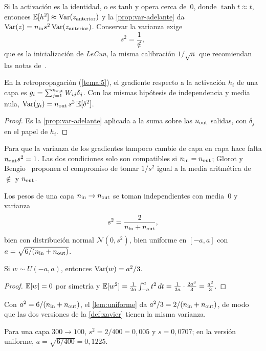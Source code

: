 Si la activación es la identidad, o es tanh y opera cerca de~0, donde $\tanh t\approx t$, entonces $\mathbb{E}[h^{2}]\approx\operatorname{Var}(z_{\text{anterior}})$ y la \cref{prop:var-adelante} da $\operatorname{Var}(z)=n_{\mathrm{in}} s^{2}\operatorname{Var}(z_{\text{anterior}})$. Conservar la varianza exige
\[
s^{2}=\frac{1}{\nin},
\]
que es la inicialización de \emph{LeCun}, la misma calibración $1/\sqrt{n}$ que recomiendan las notas de~\cite{cs231n}.

\begin{proposicion}\label{prop:var-atras}
En la retropropagación (\cref{tema:5}), el gradiente respecto a la activación $h_i$ de una capa es $g_i=\sum_{j=1}^{n_{\mathrm{out}}}W_{ij}\delta_j$. Con las mismas hipótesis de independencia y media nula, $\operatorname{Var}(g_i)=n_{\mathrm{out}}\,s^{2}\,\mathbb{E}[\delta^{2}]$.
\end{proposicion}

\begin{proof}
Es la \cref{prop:var-adelante} aplicada a la suma sobre las $n_{\mathrm{out}}$ salidas, con $\delta_j$ en el papel de $h_i$.
\end{proof}

Para que la varianza de los gradientes tampoco cambie de capa en capa hace falta $n_{\mathrm{out}} s^{2}=1$. Las dos condiciones solo son compatibles si $n_{\mathrm{in}}=n_{\mathrm{out}}$; Glorot y Bengio~\cite{glorot} proponen el compromiso de tomar $1/s^{2}$ igual a la media aritmética de $\nin$ y $n_{\mathrm{out}}$.

\begin{definicion}\label{def:xavier}
Los pesos de una capa $n_{\mathrm{in}}\to n_{\mathrm{out}}$ se toman independientes con media~0 y varianza
\[
s^{2}=\frac{2}{n_{\mathrm{in}}+n_{\mathrm{out}}},
\]
bien con distribución normal $\mathcal{N}(0,s^{2})$, bien uniforme en $[-a,a]$ con $a=\sqrt{6/(n_{\mathrm{in}}+n_{\mathrm{out}})}$.
\end{definicion}

\begin{lema}\label{lem:uniforme}
Si $w\sim U(-a,a)$, entonces $\operatorname{Var}(w)=a^{2}/3$.
\end{lema}

\begin{proof}
$\mathbb{E}[w]=0$ por simetría y $\mathbb{E}[w^{2}]=\frac{1}{2a}\int_{-a}^{a}t^{2}\,dt=\frac{1}{2a}\cdot\frac{2a^{3}}{3}=\frac{a^{2}}{3}$.
\end{proof}

Con $a^{2}=6/(n_{\mathrm{in}}+n_{\mathrm{out}})$, el \cref{lem:uniforme} da $a^{2}/3=2/(n_{\mathrm{in}}+n_{\mathrm{out}})$, de modo que las dos versiones de la \cref{def:xavier} tienen la misma varianza.

\begin{ejemplo}\label{ej:xavier}
Para una capa $300\to 100$, $s^{2}=2/400=0{,}005$ y $s=0{,}0707$; en la versión uniforme, $a=\sqrt{6/400}=0{,}1225$.
\end{ejemplo}

